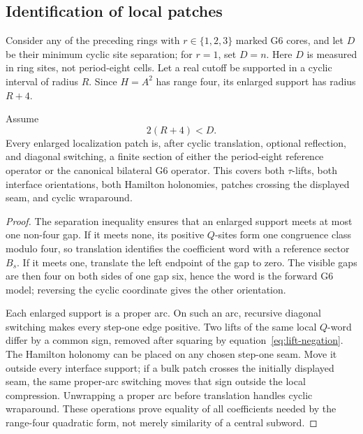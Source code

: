 \subsection{Identification of local patches}
\label{subsec:local-patch-identification}

Consider any of the preceding rings with \(r\in\{1,2,3\}\) marked G6 cores,
and let \(D\) be their minimum cyclic site separation; for \(r=1\), set
\(D=n\).  Here \(D\) is measured in ring sites, not period-eight cells.
Let a real cutoff be supported in a cyclic interval of radius
\(R\).  Since \(H=A^2\) has range four, its enlarged support has radius
\(R+4\).

\begin{proposition}
\label{prop:patch-identification}
Assume
\[
2(R+4)<D.
\]
Every enlarged localization patch is, after cyclic translation, optional
reflection, and diagonal switching, a finite section of either the
period-eight reference operator or the canonical bilateral G6 operator.
This covers both \(\tau\)-lifts, both interface orientations, both Hamilton
holonomies, patches crossing the displayed seam, and cyclic wraparound.
\end{proposition}

\begin{proof}
The separation inequality ensures that an enlarged support meets at most one
non-four gap.  If it meets none, its positive \(Q\)-sites form one congruence
class modulo four, so translation identifies the coefficient word with a
reference sector \(B_s\).  If it meets one, translate the left endpoint of
the gap to zero.  The visible gaps are then four on both sides of one gap
six, hence the word is the forward G6 model; reversing the cyclic coordinate
gives the other orientation.

Each enlarged support is a proper arc.  On such an arc, recursive diagonal
switching makes every step-one edge positive.  Two lifts of the same local
\(Q\)-word differ by a common sign, removed after squaring by
equation~\eqref{eq:lift-negation}.  The Hamilton holonomy can be placed on
any chosen step-one seam.  Move it outside every interface support; if a
bulk patch crosses the initially displayed seam, the same proper-arc
switching moves that sign outside the local compression.  Unwrapping a
proper arc before translation handles cyclic wraparound.  These operations
prove equality of all coefficients needed by the range-four quadratic form,
not merely similarity of a central subword.
\end{proof}

